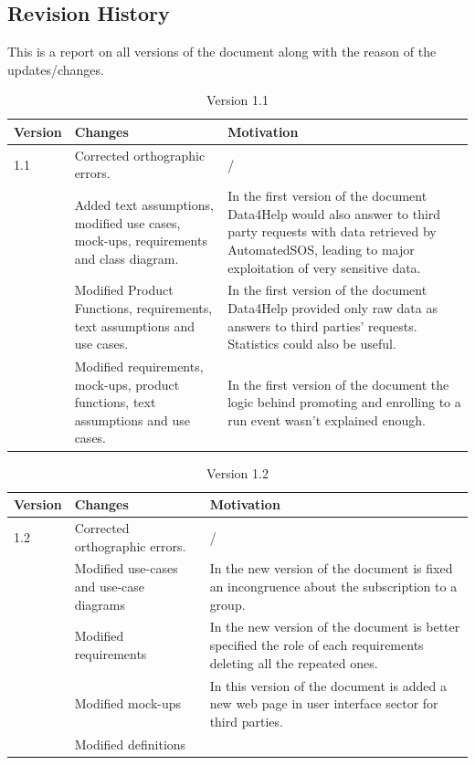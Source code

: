 \newpage
\subsection{Revision History}
This is a report on all versions of the document along with the reason of the updates/changes.

\begin{table}[h]
\begin{tabular}{|l|p{}|p{}|}
\hline
Version & Changes & Motivation\\ \hline
1.1     & Corrected orthographic errors. & / \\ \hline
 & Added text assumptions, modified use cases, mock-ups, requirements and class diagram. & In the first version of the document Data4Help would also answer to third party requests with data retrieved by AutomatedSOS, leading to major exploitation of very sensitive data.   \\ \hline
 & Modified Product Functions, requirements, text assumptions and use cases. & In the first version of the document Data4Help provided only raw data as answers to third parties' requests. Statistics could also be useful.  \\ \hline
 & Modified requirements, mock-ups, product functions, text assumptions and use cases. & In the first version of the document the logic behind promoting and enrolling to a run event wasn't explained enough. \\ \hline
\end{tabular}
\caption{Version 1.1}
\end{table}

\begin{table}[h]
\begin{tabular}{|l|p{}|p{}|}
\hline
Version & Changes & Motivation\\ \hline
1.2     & Corrected orthographic errors. & /  \\ \hline
& Modified use-cases and use-case diagrams & In the new version of the document is fixed an incongruence about the subscription to a group.  \\ \hline
 & Modified requirements & In the new version of the document is better specified the role of each requirements deleting all the repeated ones.   \\ \hline
 & Modified mock-ups & In this version of the document is added a new web page in user interface sector for third parties. \\ \hline
  & Modified definitions & \ \\ \hline
\end{tabular}
\caption{Version 1.2}
\end{table}

